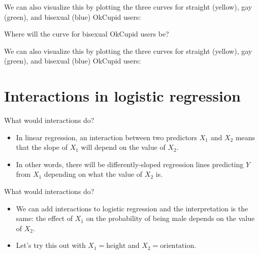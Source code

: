 \documentclass{beamer}\usepackage[]{graphicx}\usepackage[]{color}
\newenvironment{knitrout}{}{} %
\begin{document}
\begin{darkframes}
    \begin{frame}
      We can also visualize this by plotting the three curves for straight (yellow), gay (green), and bisexual (blue) OkCupid users:
\begin{knitrout}


\end{knitrout}
      Where will the curve for bisexual OkCupid users be?
    \end{frame}

    \begin{frame}
      We can also visualize this by plotting the three curves for straight (yellow), gay (green), and bisexual (blue) OkCupid users:
\begin{knitrout}


\end{knitrout}
    \end{frame}

    \section{Interactions in logistic regression}

    \begin{frame}{What would interactions do?}
      \begin{itemize}
        \item In linear regression, an interaction between two predictors $X_1$ and $X_2$ means that the \alert{slope} of $X_1$ will depend on the \alert{value} of $X_2$.
        \item In other words, there will be differently-sloped regression lines predicting $Y$ from $X_1$ depending on what the value of $X_2$ is.
      \end{itemize}
    \end{frame}

    \begin{frame}
\begin{knitrout}


\end{knitrout}
    \end{frame}

    \begin{frame}{What would interactions do?}
      \begin{itemize}
        \item We can add interactions to logistic regression and the interpretation is the same: the effect of $X_1$ on the \alert{probability of being male} depends on the \alert{value} of $X_2$.
        \item Let's try this out with $X_1=\text{height}$ and $X_2=\text{orientation}$.
      \end{itemize}
    \end{frame}


\end{darkframes}
\end{document}
